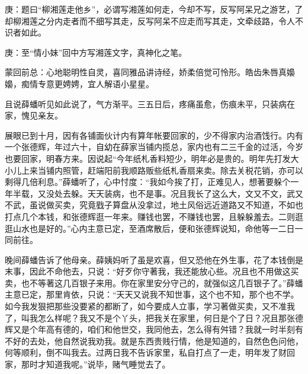 
\begin{parag}
    \begin{note}庚：题曰“柳湘莲走他乡”，必谓写湘莲如何走，今却不写，反写阿呆兄之游艺，了却柳湘莲之分内走者而不细写其走，反写阿呆不应走而写其走，文牵歧路，令人不识者如此。\end{note}
\end{parag}


\begin{parag}
    \begin{note}庚：至“情小妹”回中方写湘莲文字，真神化之笔。\end{note}
\end{parag}


\begin{parag}
    \begin{note}蒙回前总：心地聪明性自灵，喜同雅品讲诗经，娇柔倍觉可怜形。皓齿朱唇真嬝嬝，痴情专意更娉娉，宜人解语小星星。\end{note}
\end{parag}


\begin{parag}
    且说薛蟠听见如此说了，气方渐平。三五日后，疼痛虽愈，伤痕未平，只装病在家，愧见亲友。
\end{parag}


\begin{parag}
    展眼已到十月，因有各铺面伙计内有算年帐要回家的，少不得家内治酒饯行。内有一个张德辉，年过六十，自幼在薛家当铺内揽总，家内也有二三千金的过活，今岁也要回家，明春方来。因说起“今年纸札香料短少，明年必是贵的。明年先打发大小儿上来当铺内照管，赶端阳前我顺路贩些纸札香扇来卖。除去关税花销，亦可以剩得几倍利息。”薛蟠听了，心中忖度：“我如今挨了打，正难见人，想著要躲个一年半载，又没处去躲。天天装病，也不是事。况且我长了这么大，文又不文，武又不武，虽说做买卖，究竟戥子算盘从没拿过，地土风俗远近道路又不知道，不如也打点几个本钱，和张德辉逛一年来。赚钱也罢，不赚钱也罢，且躲躲羞去。二则逛逛山水也是好的。”心内主意已定，至酒席散后，便和张德辉说知，命他等一二日一同前往。
\end{parag}


\begin{parag}
    晚间薛蟠告诉了他母亲。薛姨妈听了虽是欢喜，但又恐他在外生事，花了本钱倒是末事，因此不命他去，只说：“好歹你守著我，我还能放心些。况且也不用做这买卖，也不等著这几百银子来用。你在家里安分守己的，就强似这几百银子了。”薛蟠主意已定，那里肯依，只说：“天天又说我不知世事，这个也不知，那个也不学。如今我发狠把那些没要紧的都断了，如今要成人立事，学习著做买卖，又不准我了，叫我怎么样呢？我又不是个丫头，把我关在家里，何日是个了日？况且那张德辉又是个年高有德的，咱们和他世交，我同他去，怎么得有舛错？我就一时半刻有不好的去处，他自然说我劝我。就是东西贵贱行情，他是知道的，自然色色问他，何等顺利，倒不叫我去。过两日我不告诉家里，私自打点了一走，明年发了财回家，那时才知道我呢。”说毕，赌气睡觉去了。
\end{parag}



